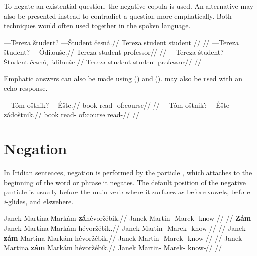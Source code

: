 To negate an existential question, the negative copula is used. An alternative may also be presented instead to contradict a question more emphatically. Both techniques would often used together in the spoken language.

\pex
\a
\begingl
\gla ---Tereza \v{s}tudent? ---\v{S}tudent \v{c}esn\'a.//
\glb Tereza student student //
\glft {}//
\endgl
\a
\begingl
\gla ---Tereza \v{s}tudent? ---\'Odilou\v{s}c.//
\glb Tereza student professor//
\glft {}//
\endgl
\a
\begingl
\gla ---Tereza \v{s}tudent? ---\v{S}tudent \v{c}esn\'a, \'odilou\v{s}c.//
\glb Tereza student student  professor//
\glft {}//
\endgl
\xe

Emphatic answers can also be made using  () and   ().  may also be used with an echo response.

\pex
\a
\begingl
\gla ---T\'om o\v{s}tnik? ---\'E\v{s}te.//
\glb book read- of:course//
\glft {}//
\endgl
\a
\begingl
\gla ---T\'om o\v{s}tnik? ---\'E\v{s}te z\'ado\v{s}tnik.//
\glb book read- of:course read-//
\glft {}//
\endgl
\xe

\section{Negation}

In Iridian sentences, negation is performed by the particle , which attaches to the beginning of the word or phrase  it negates. The default position of the negative particle is usually before the main verb where it surfaces as  before vowels,  before \emph{i}-glides, and  elswehere.

\pex
\a
\begingl
    \gla Janek Martina Mark\'am \textbf{z\'a}h\'evor\v{z}\'ebik.//
    \glb Janek Martin- Marek- know-//
    \glft {}//
\endgl
\a
\begingl
    \gla \textbf{Z\'am} Janek Martina Mark\'am h\'evor\v{z}\'ebik.//
    \glb {} Janek Martin- Marek- know-//
    \glft {}//
\endgl
\a
\begingl
    \gla Janek \textbf{z\'am} Martina Mark\'am h\'evor\v{z}\'ebik.//
    \glb Janek  Martin- Marek- know-//
    \glft {}//
\endgl
\a
\begingl
    \gla Janek Martina \textbf{z\'am} Mark\'am h\'evor\v{z}\'ebik.//
    \glb Janek Martin-  Marek- know-//
    \glft {}//
\endgl
\xe

